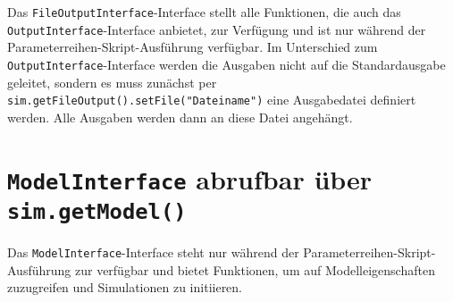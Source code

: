 Das \texttt{FileOutputInterface}-Interface stellt alle Funktionen, die auch das
\texttt{OutputInterface}-Interface anbietet, zur Verfügung und ist nur während
der Parameterreihen-Skript-Ausführung verfügbar. Im Unterschied
zum \texttt{OutputInterface}-Interface werden die Ausgaben nicht auf die Standardausgabe
geleitet, sondern es muss zunächst per \texttt{sim.getFileOutput().setFile("{}Dateiname")}
eine Ausgabedatei definiert werden. Alle Ausgaben werden dann an diese
Datei angehängt.



\chapter{\texttt{ModelInterface} abrufbar über \texttt{sim.getModel()}}

Das \texttt{ModelInterface}-Interface steht nur während der Parameterreihen-Skript-Ausführung
zur verfügbar und bietet Funktionen, um auf Modelleigenschaften zuzugreifen und
Simulationen zu initiieren.

